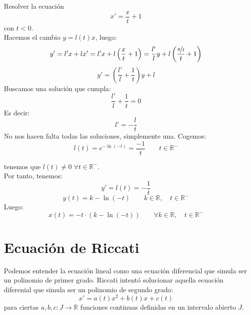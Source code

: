 \begin{ejemplo}
    Resolver la ecuación
    \begin{equation*}
        x' = \dfrac{x}{t} + 1
    \end{equation*}
    con $t<0$.\\

    Hacemos el cambio $y=l(t)x$, luego:
    \begin{equation*}
        y' = l'x + lx' = l' x + l\left(\dfrac{x}{t}+1\right) = \dfrac{l'}{l}y + l\left(\dfrac{\nicefrac{y}{l}}{t}+1\right)
    \end{equation*}
    \begin{equation*}
        y' = \left(\dfrac{l'}{l}+\dfrac{1}{t}\right) y + l
    \end{equation*}
    Buscamos una solución que cumpla:
    \begin{equation*}
        \dfrac{l'}{l}+\dfrac{1}{t} = 0
    \end{equation*}
    Es decir:
    \begin{equation*}
        l' = -\dfrac{l}{t}
    \end{equation*}
    No nos hacen falta todas las soluciones, simplemente una. Cogemos:
    \begin{equation*}
        l(t) = e^{-\ln(-t)} = \dfrac{-1}{t} \qquad t\in \mathbb{R}^-
    \end{equation*}

    tenemos que $l(t)\neq 0$ $\forall t\in \mathbb{R}^-$.\\

    Por tanto, tenemos:
    \begin{equation*}
        y' = l(t) = -\dfrac{1}{t}
    \end{equation*}
    \begin{equation*}
        y(t) = k - \ln(-t) \qquad k\in \mathbb{R}, \quad t\in \mathbb{R}^-
    \end{equation*}
    Luego:
    \begin{equation*}
        x(t) = -t\cdot (k-\ln(-t)) \qquad \forall k\in \mathbb{R}, \quad t\in \mathbb{R}^-
    \end{equation*}
\end{ejemplo}

\section{Ecuación de Riccati}
Podemos entender la ecuación lineal como una ecuación diferencial que simula ser un polinomio de primer grado. Riccati intentó solucionar aquella ecuación diferenial que simula ser un polinomio de segundo grado:
\begin{equation}\label{eq:riccati}
    x' = a(t) x^2+b(t)x+c(t)
\end{equation}
para ciertas $a,b,c:J\rightarrow\mathbb{R}$ funciones continuas definidas en un intervalo abierto $J$.

